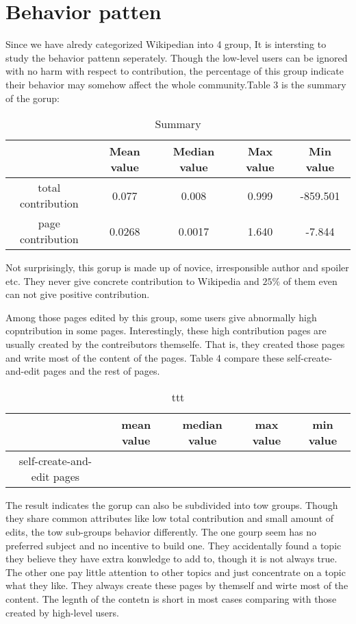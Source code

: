 \documentclass{elsarticle}
\begin{document}
\section{Behavior patten}
\label{sec:behavior-patten}

Since we have alredy categorized Wikipedian into 4 group, It is
intersting to study the behavior pattenn seperately. Though the
low-level users can be ignored with no harm with respect to
contribution, the percentage of this group indicate their behavior may
somehow affect the whole community.Table 3 is the summary of the
gorup:
\begin{table}
  \centering
  \caption{Summary}
  \begin{tabular}[h]{|c|c|c|c|c|}
    \hline
   & Mean value&Median value&Max value&Min value \\\hline
   total contribution& 0.077&0.008&0.999&-859.501 \\\hline
   page contribution& 0.0268&0.0017&1.640&-7.844 \\\hline
  \end{tabular}

\end{table}
Not surprisingly, this gorup is made up of novice, irresponsible
author and spoiler etc. They never give concrete contribution to
Wikipedia and $25\%$ of them even can not  give positive contribution.



Among those pages edited by this group, some users give abnormally
high copntribution in some pages. Interestingly, these high
contribution pages are usually created by the contreibutors
themselfe. That is, they created those pages and write most of the
content of the pages. Table 4 compare these self-create-and-edit pages
and the rest of pages.
\begin{table}[h]
  \centering
  \begin{tabular}{|c|c|c|c|c|}
    \hline
    &mean value&median value&max value&min value \\\hline
    self-create-and-edit pages&
  \end{tabular}
  \caption{ttt}
\end{table}

The result indicates the gorup can also be subdivided into tow
groups. Though they share common attributes like low total
contribution and small amount of edits, the tow sub-groups behavior
differently. The one gourp seem has no preferred subject and no
incentive to build one. They
accidentally found a topic they believe they have extra konwledge to
add to, though it is not always true. The other one pay little
attention to other topics and just concentrate on a topic what they
like. They always create these pages by themself and wirte most of the
content. The legnth of the contetn is short in most cases comparing
with those created by high-level users.
\end{document}
